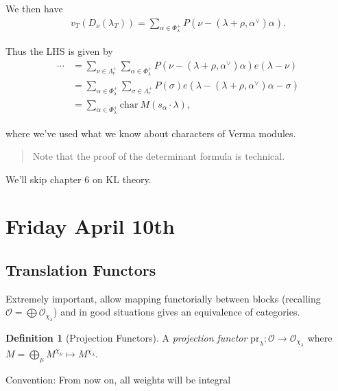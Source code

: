 \documentclass[11pt]{scrartcl}
\theoremstyle{definition}
\theoremstyle{theorem}
\theoremstyle{proof}
\theoremstyle{definition}
\newtheorem{definition}{Definition}[theorem]
\theoremstyle{break}
\theoremstyle{problem}
\newcommand{\ch}[0]{\mathrm{char}~}
\newcommand{\dual}[0]{^\vee}
\newcommand{\OO}[0]{{\mathcal{O}}}
\renewcommand{\to}[0]{\longrightarrow}
\begin{document}
We then have \begin{align*}
v_T(D_\nu(\lambda_T)) = \sum_{\alpha \in \Phi^+_\lambda} P(\nu - (\lambda + \rho, \alpha\dual)\alpha)
.\end{align*}

Thus the LHS is given by \begin{align*}
\cdots
&= \sum _{\nu \in \Lambda_r^+} \sum_{\alpha\in \Phi_\lambda^+} P(\nu - (\lambda + \rho, \alpha\dual) \alpha) e(\lambda - \nu) \\
&= \sum _{\alpha \in \Phi_\lambda^+} \sum_{\sigma \in \Lambda_r^+} P(\sigma) e(\lambda - (\lambda + \rho, \alpha\dual)\alpha - \sigma) \\
&= \sum_{\alpha \in \Phi_\lambda^+} \ch M(s_\alpha \cdot \lambda)
,\end{align*}

where we've used what we know about characters of Verma modules.

\begin{quote}
Note that the proof of the determinant formula is technical.
\end{quote}

We'll skip chapter 6 on KL theory.

\hypertarget{friday-april-10th}{%
\section{Friday April 10th}\label{friday-april-10th}}

\hypertarget{translation-functors}{%
\subsection{Translation Functors}\label{translation-functors}}

Extremely important, allow mapping functorially between blocks
(recalling \(\OO = \bigoplus \OO_{\chi_\lambda}\)) and in good
situations gives an equivalence of categories.

\begin{definition}[Projection Functors]

A \emph{projection functor}
\(\mathrm{pr}_\lambda: \OO \to \OO_{\chi_\lambda}\) where
\(M = \bigoplus_\mu M^{\chi_\mu} \mapsto M^{\chi_\lambda}\).\end{definition}

Convention: From now on, all weights will be integral
\end{document}
